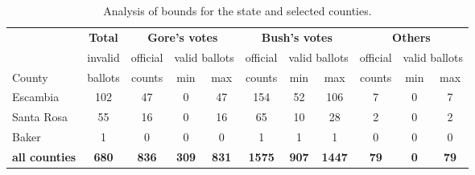 \documentclass[11pt,titlepage]{article}
\begin{document}
\begin{table}[t]
\begin{center}
\begin{tabular}{l c |ccc|ccc|ccc}
    & \bf Total & \multicolumn{3}{c|}{\bf Gore's votes} &
  \multicolumn{3}{c|}{\bf Bush's votes} &
  \multicolumn{3}{c}{\bf Others} \\
  & invalid & official & \multicolumn{2}{c|}{valid ballots} & official &
  \multicolumn{2}{c|}{valid ballots} & official &
  \multicolumn{2}{c}{valid ballots} \\
County & ballots & counts & min & max & counts & min & max & counts &
  min & max\\
\hline 
Escambia   & 102 & 47 & 0 & 47 & 154 & 52 & 106 & 7 & 0 & 7 \\
Santa Rosa &  55 & 16 & 0 & 16 &  65 & 10 &  28 & 2 & 0 & 2 \\
Baker      &  1  &  0 & 0 &  0 &   1 &  1 &   1 & 0 & 0 & 0 \\
\hline
\bf all counties & \bf 680 & \bf 836 & \bf 309 & \bf 831 & \bf 1575 &
  \bf 907 & \bf 1447 & \bf 79 & \bf 0 & \bf 79 \\ 
\end{tabular} \caption{Analysis of bounds for the state  and 
  selected counties.}\label{tb:bounds}
\end{center}
\end{table} 
\end{document}
